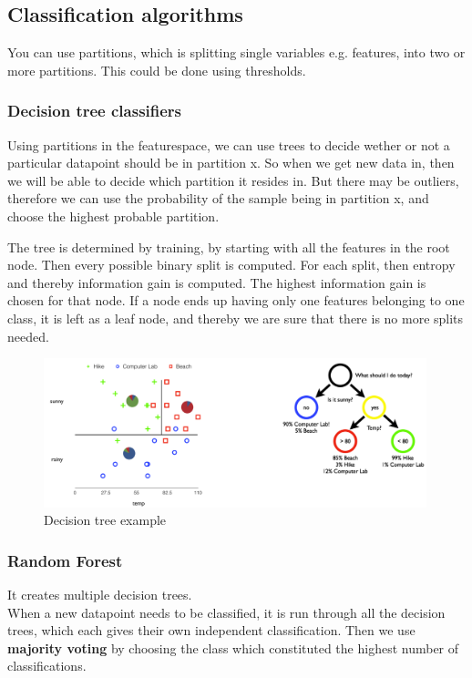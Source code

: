\documentclass[a4paper]{article}
\begin{document}
\newpage
\subsection{Classification algorithms}
You can use partitions, which is splitting single variables e.g. features, into two or more partitions. This could be done using thresholds. 

\subsubsection{Decision tree classifiers}
Using partitions in the featurespace, we can use trees to decide wether or not a particular datapoint should be in partition x. So when we get new data in, then we will be able to decide which partition it resides in. But there may be outliers, therefore we can use the probability of the sample being in partition x, and choose the highest probable partition. 


The tree is determined by training, by starting with all the features in the root node. Then every possible binary split is computed. For each split, then entropy and thereby information gain is computed. The highest information gain is chosen for that node. If a node ends up having only one features belonging to one class, it is left as a leaf node, and thereby we are sure that there is no more splits needed. 

\begin{figure}[H]
\centering
\includegraphics[width=0.99\textwidth]{figures/Decision_trees.png}
\caption{Decision tree example}
\label{fig:Decision_tree}
\end{figure} 

\subsubsection{Random Forest}
It creates multiple decision trees.\\
When a new datapoint needs to be classified, it is run through all the decision trees, which each gives their own independent classification. Then we use \textbf{majority voting} by choosing the class which constituted the highest number of classifications. 
\end{document}
